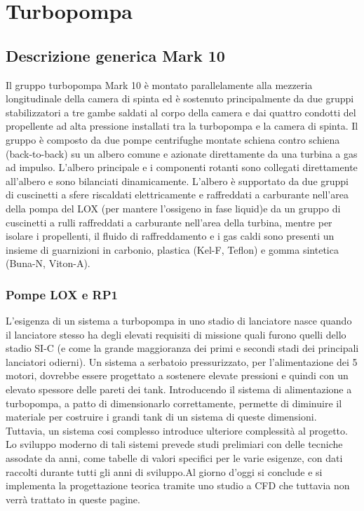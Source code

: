 \section{Turbopompa}
\label{sec:turbopompa}

\subsection{Descrizione generica Mark 10}
Il gruppo turbopompa Mark 10 è montato parallelamente alla mezzeria longitudinale della camera di spinta ed è sostenuto principalmente da due gruppi stabilizzatori a tre gambe saldati al corpo della camera e dai quattro condotti del propellente ad alta pressione installati tra la turbopompa e la camera di spinta. 
Il gruppo è composto da due pompe centrifughe montate schiena contro schiena (back-to-back) su un albero comune e azionate direttamente da una turbina a gas ad impulso.
L'albero principale e i componenti rotanti sono collegati direttamente all'albero e sono bilanciati dinamicamente.
L'albero è supportato da due gruppi di cuscinetti a sfere riscaldati elettricamente e raffreddati a carburante nell'area della pompa del LOX (per mantere l'ossigeno in fase liquid)e da un gruppo di cuscinetti a rulli raffreddati a carburante nell'area della turbina, mentre per isolare i propellenti, il fluido di raffreddamento e i gas caldi sono presenti un insieme di guarnizioni in carbonio, plastica (Kel-F, Teflon) e gomma sintetica (Buna-N, Viton-A).
\subsubsection{Pompe LOX e RP1}

L'esigenza di un sistema a turbopompa in uno stadio di lanciatore nasce quando il lanciatore stesso ha degli elevati requisiti di missione quali furono quelli dello stadio SI-C (e come la grande maggioranza dei primi e secondi stadi dei principali lanciatori odierni). Un sistema a serbatoio pressurizzato, per l'alimentazione dei 5 motori, dovrebbe essere progettato a sostenere elevate pressioni e quindi con un elevato spessore delle pareti dei tank. Introducendo il sistema di alimentazione a turbopompa, a patto di dimensionarlo correttamente, permette di diminuire il materiale per costruire i grandi tank di un sistema di queste dimensioni.
Tuttavia, un sistema cosi complesso introduce ulteriore complessità al progetto. Lo sviluppo moderno di tali sistemi prevede studi prelimiari con delle tecniche assodate da anni, come tabelle di valori specifici per le varie esigenze, con dati raccolti durante tutti gli anni di sviluppo.Al giorno d'oggi si conclude e si implementa la progettazione teorica tramite uno studio a CFD che tuttavia non verrà trattato in queste pagine. 

